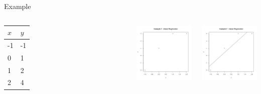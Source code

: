 \begin{frame}{Example}
  
  \begin{columns}
    \begin{tabular}{l|l}
      $x$ & $y$ \\ \hline
      -1 & -1 \\
      0 & 1 \\
      1 & 2 \\
      2 & 4
    \end{tabular}

    
    {
      \centerline{\includegraphics[width=6cm]{img/week2-Day3-Regression1}}
    }

    {
      \centerline{\includegraphics[width=6cm]{img/week2-Day3-Regression2}}
    }


    \end{columns}

\end{frame}




